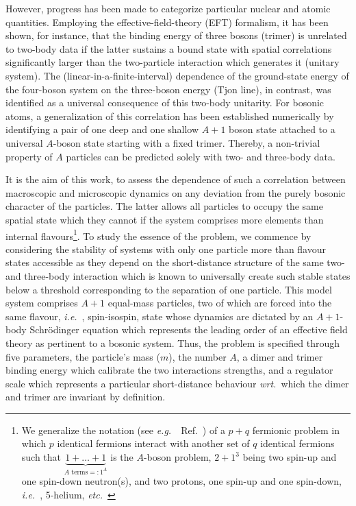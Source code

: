 \documentclass[preprint,12pt]{elsarticle}
\newcommand{\wrt}{\textit{wrt.}~}
\newcommand{\etc}{\textit{etc.}~}
\newcommand{\eg}{\textit{e.g.}~}
\newcommand{\ie}{\textit{i.e.}~}
\begin{document}
However, progress has been made to categorize particular nuclear and atomic quantities. Employing the
effective-field-theory (EFT) formalism, it has been shown, for instance, that the binding energy of three bosons (trimer)
is unrelated to two-body data if the latter sustains a bound state with spatial correlations significantly larger
than the two-particle interaction which generates it (unitary system). The (linear-in-a-finite-interval) dependence
of the ground-state
energy of the four-boson system on the three-boson energy (Tjon line), in contrast, was identified as a
universal consequence of this two-body unitarity. For bosonic atoms, a generalization of this correlation has been
established numerically by identifying a pair of one deep and one shallow $A+1$ boson state attached to
a universal $A$-boson state starting with a fixed trimer. Thereby, a non-trivial property of $A$ particles can
be predicted solely with two- and three-body data.

It is the aim of this work, to assess the dependence of such a correlation between macroscopic and microscopic
dynamics on any deviation from the purely bosonic character of the particles.
The latter allows all particles to occupy the same spatial state which they cannot if the system comprises
more elements than internal flavours\footnote{We generalize the notation (see \eg~Ref.~\cite{PhysRevA.92.053624})
of a $p+q$ fermionic 
problem in which $p$ identical fermions
interact with another set of $q$ identical fermions such that $\underbrace{1+\ldots+1}_{\text{$A$ terms}=:1^A}$ is 
the $A$-boson problem, $2+1^3$ being two spin-up and one spin-down neutron(s), and two protons, one spin-up and
one spin-down, \ie, 5-helium, \etc}.
To study the essence of the problem, we commence by considering the stability of systems with only one particle
more than flavour states accessible as they depend on the short-distance structure of the same two- and three-body
interaction which is known to universally create such stable states below a threshold corresponding to the separation
of one particle. This model system comprises $A+1$ equal-mass particles, two of which are forced into the same
flavour, \ie, spin-isospin, state whose dynamics are dictated by an $A+1$-body Schr\"odinger equation which
represents the leading order of an effective field theory as pertinent to a bosonic system.
Thus, the problem is specified through five parameters, the particle's mass ($m$), the number $A$, a dimer and trimer
binding energy which calibrate the two interactions strengths, and a regulator scale which represents a particular
short-distance behaviour \wrt which the dimer and trimer are invariant by definition.
\end{document}

